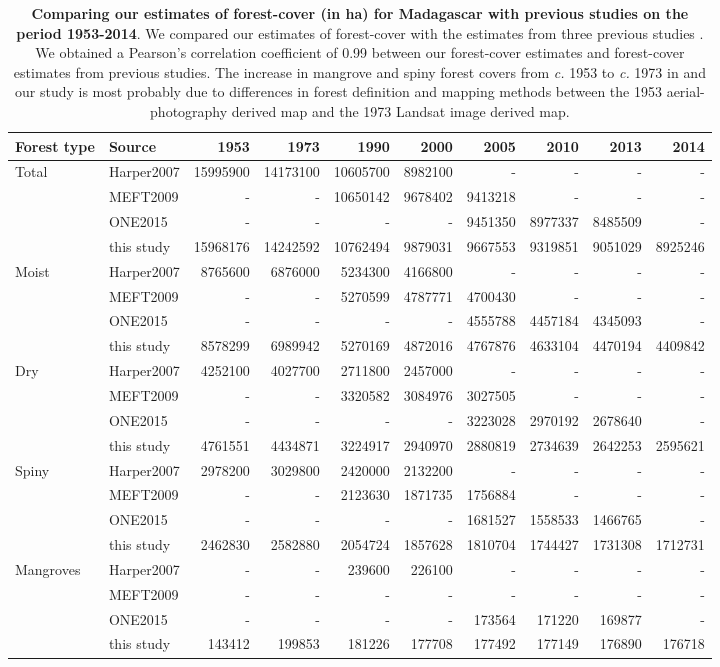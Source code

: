 \documentclass[a4paper, 12pt, leqno]{article} %
\begin{document}
\begin{table}[!h]
  {\footnotesize
  \begin{longtable}[]{@{}llrrrrrrrr@{}}
    \toprule
    Forest type & Source & 1953 & 1973 & 1990 & 2000 & 2005 & 2010 & 2013 &
    2014\tabularnewline
    \midrule
    \endhead
    Total & Harper2007 & 15995900 & 14173100 & 10605700 & 8982100 & - & - &
    - & -\tabularnewline
    & MEFT2009 & - & - & 10650142 & 9678402 & 9413218 & - & - &
    -\tabularnewline
    & ONE2015 & - & - & - & - & 9451350 & 8977337 & 8485509 &
    -\tabularnewline
    & this study & 15968176 & 14242592 & 10762494 & 9879031 & 9667553 &
    9319851 & 9051029 & 8925246\tabularnewline
    Moist & Harper2007 & 8765600 & 6876000 & 5234300 & 4166800 & - & - & - &
    -\tabularnewline
    & MEFT2009 & - & - & 5270599 & 4787771 & 4700430 & - & - &
    -\tabularnewline
    & ONE2015 & - & - & - & - & 4555788 & 4457184 & 4345093 &
    -\tabularnewline
    & this study & 8578299 & 6989942 & 5270169 & 4872016 & 4767876 & 4633104
    & 4470194 & 4409842\tabularnewline
    Dry & Harper2007 & 4252100 & 4027700 & 2711800 & 2457000 & - & - & - &
    -\tabularnewline
    & MEFT2009 & - & - & 3320582 & 3084976 & 3027505 & - & - &
    -\tabularnewline
    & ONE2015 & - & - & - & - & 3223028 & 2970192 & 2678640 &
    -\tabularnewline
    & this study & 4761551 & 4434871 & 3224917 & 2940970 & 2880819 & 2734639
    & 2642253 & 2595621\tabularnewline
    Spiny & Harper2007 & 2978200 & 3029800 & 2420000 & 2132200 & - & - & - &
    -\tabularnewline
    & MEFT2009 & - & - & 2123630 & 1871735 & 1756884 & - & - &
    -\tabularnewline
    & ONE2015 & - & - & - & - & 1681527 & 1558533 & 1466765 &
    -\tabularnewline
    & this study & 2462830 & 2582880 & 2054724 & 1857628 & 1810704 & 1744427
    & 1731308 & 1712731\tabularnewline
    Mangroves & Harper2007 & - & - & 239600 & 226100 & - & - & - &
    -\tabularnewline
    & MEFT2009 & - & - & - & - & - & - & - & -\tabularnewline
    & ONE2015 & - & - & - & - & 173564 & 171220 & 169877 & -\tabularnewline
    & this study & 143412 & 199853 & 181226 & 177708 & 177492 & 177149 &
    176890 & 176718\tabularnewline
    \bottomrule
  \end{longtable}}
  \addtocounter{table}{-1}

  \caption{\textbf{Comparing our estimates of forest-cover (in ha) for
      Madagascar with previous studies on the period 1953-2014}. We
    compared our estimates of forest-cover with the estimates from
    three previous studies \citep{Harper2007, MEFT2009, ONE2015}. We
    obtained a Pearson's correlation coefficient of 0.99 between our
    forest-cover estimates and forest-cover estimates from previous
    studies. The increase in mangrove and spiny forest covers from
    \emph{c.} 1953 to \emph{c.} 1973 in \citet{Harper2007} and our
    study is most probably due to differences in forest definition and
    mapping methods between the 1953 aerial-photography derived map
    and the 1973 Landsat image derived map.}

  \label{tab:comp_forest}
\end{table}
\end{document}
